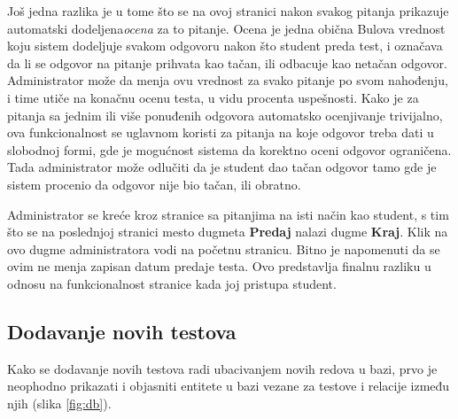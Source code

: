 Još jedna razlika je u tome što se na ovoj stranici nakon svakog pitanja prikazuje automatski dodeljena\emph{ocena} za to pitanje. Ocena je jedna obična Bulova vrednost koju sistem dodeljuje svakom odgovoru nakon što student preda test, i označava da li se odgovor na pitanje prihvata kao tačan, ili odbacuje kao netačan odgovor. Administrator može da menja ovu vrednost za svako pitanje po svom nahođenju, i time utiče na konačnu ocenu testa, u vidu procenta uspešnosti. Kako je za pitanja sa jednim ili više ponuđenih odgovora automatsko ocenjivanje trivijalno, ova funkcionalnost se uglavnom koristi za pitanja na koje odgovor treba dati u slobodnoj formi, gde je mogućnost sistema da korektno oceni odgovor ograničena. Tada administrator može odlučiti da je student dao tačan odgovor tamo gde je sistem procenio da odgovor nije bio tačan, ili obratno.

Administrator se kreće kroz stranice sa pitanjima na isti način kao student, s tim što se na poslednjoj stranici mesto dugmeta \textbf{Predaj} nalazi dugme \textbf{Kraj}. Klik na ovo dugme administratora vodi na početnu stranicu. Bitno je napomenuti da se ovim ne menja zapisan datum predaje testa. Ovo predstavlja finalnu razliku u odnosu na funkcionalnost stranice kada joj pristupa student.

\subsection{Dodavanje novih testova}
Kako se dodavanje novih testova radi ubacivanjem novih redova u bazi, prvo je neophodno prikazati i objasniti entitete u bazi vezane za testove i relacije između njih (slika \ref{fig:db}).

